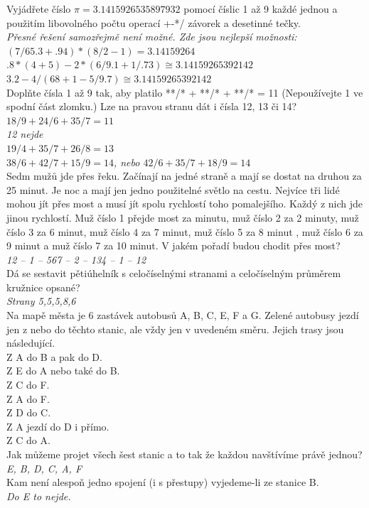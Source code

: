 \begin{multicols}{\value{columnsgames}}
\noindent
Vyjádřete číslo $\pi = 3.1415926535897932$ pomocí číslic 1 až 
9 každé jednou a použitím libovolného počtu operací +-*/ závorek 
a desetinné tečky.\\[1 mm]
{\sl Přesné řešení samozřejmě není možné. Zde jsou nejlepší možnosti:\\
$(7/65.3+.94)*(8/2-1) = 3.14159264$\\
$.8 * (4+5) - 2 * (6/9.1 + 1/.73) \cong 3.14159265392142$\\
$3.2-4/(68+1-5/9.7) \cong 3.14159265392142$}\\

\noindent
Doplňte čísla 1 až 9 tak, aby platilo **/* + **/* + **/* 
= 11 (Nepoužívejte 1 ve spodní část zlomku.) Lze na pravou
stranu dát i čísla 12, 13 či 14?
{\sl $18/9 + 24/6 + 35/7 = 11$\\
12 nejde\\
$19 / 4 + 35 / 7 + 26 / 8 = 13$\\
$38 / 6 + 42 / 7 + 15 / 9 = 14$, nebo 
$42 / 6 + 35 / 7 + 18 / 9 = 14$}\\

\noindent
Sedm mužů jde přes řeku. Začínají na jedné straně a mají 
se dostat na druhou za 25 minut. Je noc a mají jen jedno použitelné 
světlo na cestu. Nejvíce tři lidé mohou jít přes most a musí 
jít spolu rychlostí toho pomalejšího. Každý z nich jde jinou 
rychlostí. Muž číslo 1 přejde most za minutu, muž číslo 2 za 
2 minuty, muž číslo 3 za 6 minut, muž číslo 4 za 7 minut, muž 
číslo 5 za 8 minut , muž číslo 6 za 9 minut a muž číslo 7 za 
10 minut. V jakém pořadí budou chodit přes most?\\[1 mm]
{\sl 12 -- 1 -- 567 -- 2 -- 134 -- 1 -- 12}\\

\noindent
Dá se sestavit pětiúhelník s celočíselnými stranami a celočíselným 
průměrem kružnice opsané?\\[1 mm]
{\sl Strany 5,5,5,8,6}\\

\noindent
Na mapě města je 6 zastávek autobusů A, B, C, E, F a G. Zelené 
autobusy jezdí jen z nebo do těchto stanic, ale vždy jen v uvedeném 
směru. Jejich trasy jsou následující.\\
Z A do B a pak do D.\\
Z E do A nebo také do B.\\
Z C do F.\\
Z A do F.\\
Z D do C.\\
Z A jezdí do D i přímo.\\
Z C do A.\\[1 mm]
Jak můžeme projet všech šest stanic a to tak že každou navštívíme 
právě jednou?\\[1 mm]
{\sl E, B, D, C, A, F}\\
Kam není alespoň jedno spojení (i s přestupy) vyjedeme-li 
ze stanice B.\\[1 mm]
{\sl Do E to nejde.}\\


\end{multicols}
